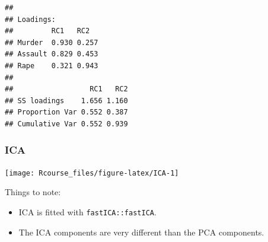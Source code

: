 \documentclass[]{book}
\newenvironment{Shaded}{\begin{snugshade}}{\end{snugshade}}
\newcommand{\KeywordTok}[1]{\textcolor[rgb]{0.13,0.29,0.53}{\textbf{{#1}}}}
\newcommand{\DataTypeTok}[1]{\textcolor[rgb]{0.13,0.29,0.53}{{#1}}}
\newcommand{\DecValTok}[1]{\textcolor[rgb]{0.00,0.00,0.81}{{#1}}}
\newcommand{\FloatTok}[1]{\textcolor[rgb]{0.00,0.00,0.81}{{#1}}}
\newcommand{\StringTok}[1]{\textcolor[rgb]{0.31,0.60,0.02}{{#1}}}
\newcommand{\CommentTok}[1]{\textcolor[rgb]{0.56,0.35,0.01}{\textit{{#1}}}}
\newcommand{\NormalTok}[1]{{#1}}
\providecommand{\tightlist}{%
  \setlength{\itemsep}{0pt}\setlength{\parskip}{0pt}}
\theoremstyle{definition}
\theoremstyle{definition}
\theoremstyle{remark}
\begin{document}
\begin{verbatim}
## 
## Loadings:
##         RC1   RC2  
## Murder  0.930 0.257
## Assault 0.829 0.453
## Rape    0.321 0.943
## 
##                  RC1   RC2
## SS loadings    1.656 1.160
## Proportion Var 0.552 0.387
## Cumulative Var 0.552 0.939
\end{verbatim}

\subsubsection{ICA}\label{ica}

\begin{Shaded}
\end{Shaded}

\texttt{[image: Rcourse\_files/figure-latex/ICA-1]}

Things to note:

\begin{itemize}
\tightlist
\item
  ICA is fitted with \texttt{fastICA::fastICA}.
\item
  The ICA components are very different than the PCA components.
\end{itemize}
\end{document}
